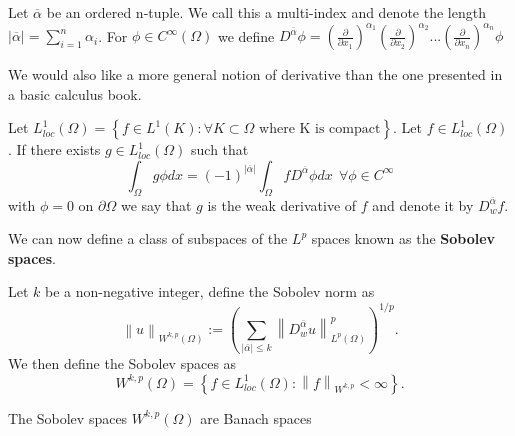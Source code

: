\documentclass[../Main/main.tex]{subfiles}
\begin{document}
	\begin{definition}
		Let $\overline{\alpha}$ be an ordered n-tuple. We call this a multi-index and denote the length $|\overline{\alpha}| = \sum_{i=1}^n 		\alpha_i$.
		For $\phi \in C^{\infty}(\Omega)$ we define $D^{\overline{\alpha}}\phi = (\frac{\partial }{\partial x_1})^{\alpha_1}(\frac{\partial }{\partial x_2})^{\alpha_2}...(\frac{\partial }{\partial x_n})^{\alpha_n}\phi$
	\end{definition}
	
	We would also like a more general notion of derivative than the one presented in a basic calculus book.
	\begin{definition}
		Let $L_{loc}^1(\Omega) =\left \{  \right. f\in L^1(K):\forall K \subset \Omega \text{  where K is compact}\left.  \right \}$.
		Let $f \in L_{loc}^1(\Omega)$. If there exists $g\in L_{loc}^1 (\Omega)$ such that 
		\begin{equation}
			\int_{\Omega} g \phi dx = (-1)^{|\overline{\alpha}|} \int_{\Omega} f D^{\overline{\alpha}} \phi dx \ \ \forall \phi \in C^{\infty}
		\end{equation}
		 with $\phi = 0$ on $\partial \Omega$  we say that $g$ is the weak derivative of $f$ and denote it by $D_w^{\overline{\alpha}}f$.
	\end{definition}
	
	
	We can now define a class of subspaces of the $L^p$ spaces known as the \textbf{Sobolev spaces}.
	\begin{definition}
		Let $k$ be a non-negative integer, define the Sobolev norm as 
		\begin{equation*}
			\left \| u \right \|_{W^{k,p}(\Omega)} := \left (\sum_{|\overline{\alpha}| \leq k} \left \| D_w^{\overline{\alpha}}u \right \|_{L^p(\Omega)}^p\right )^{1/p}.
		\end{equation*}
		We then define the Sobolev spaces as 
		\begin{equation*}
			W^{k,p}(\Omega) = \left \{  \right. f\in L^1_{loc}(\Omega):\left \| f \right \|_{W^{k,p}}<\infty \left.  \right \}.
		\end{equation*}
	\end{definition}
	\begin{theorem}
		The Sobolev spaces $W^{k,p}(\Omega)$ are Banach spaces
	\end{theorem}
	
\end{document}
